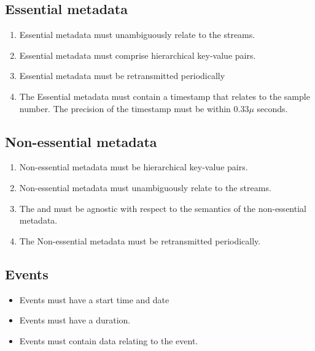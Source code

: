 \subsection{Essential metadata}
\begin{enumerate}
	\item Essential metadata must unambiguously relate to the streams.
	\item Essential metadata must comprise hierarchical key-value pairs.
	\item Essential metadata must be retransmitted periodically
	\item The Essential metadata must contain a timestamp that relates to the sample number. The precision of the timestamp must be within $0.33\mu$ seconds.
\end{enumerate}

\subsection{Non-essential metadata}
\begin{enumerate}
	\item Non-essential metadata must be hierarchical key-value pairs.
	\item Non-essential metadata must unambiguously relate to the streams.
	\item The  and  must be agnostic with respect to the semantics of the non-essential metadata.
	\item The Non-essential metadata must be retransmitted periodically.
\end{enumerate}

\subsection{Events}
\begin{itemize}
	\item Events must have a start time and date
	\item Events must have a duration.
	\item Events must contain data relating to the event.
\end{itemize}

